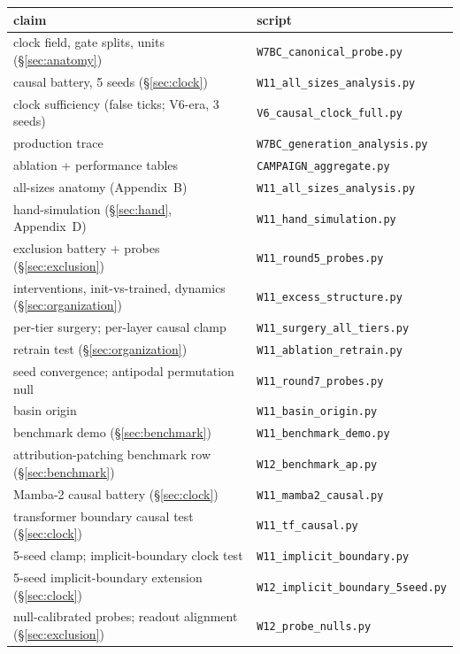 \documentclass[11pt]{article}
\begin{document}
\begin{center}
\small
\begin{tabular}{ll}
\toprule
claim & script \\
\midrule
clock field, gate splits, units (\S\ref{sec:anatomy}) & \texttt{W7BC\_canonical\_probe.py} \\
causal battery, 5 seeds (\S\ref{sec:clock}) & \texttt{W11\_all\_sizes\_analysis.py} \\
clock sufficiency (false ticks; V6-era, 3 seeds) & \texttt{V6\_causal\_clock\_full.py} \\
production trace & \texttt{W7BC\_generation\_analysis.py} \\
ablation + performance tables & \texttt{CAMPAIGN\_aggregate.py} \\
all-sizes anatomy (Appendix~B) & \texttt{W11\_all\_sizes\_analysis.py} \\
hand-simulation (\S\ref{sec:hand}, Appendix~D) & \texttt{W11\_hand\_simulation.py} \\
exclusion battery + probes (\S\ref{sec:exclusion}) & \texttt{W11\_round5\_probes.py} \\
interventions, init-vs-trained, dynamics (\S\ref{sec:organization}) & \texttt{W11\_excess\_structure.py} \\
per-tier surgery; per-layer causal clamp & \texttt{W11\_surgery\_all\_tiers.py} \\
retrain test (\S\ref{sec:organization}) & \texttt{W11\_ablation\_retrain.py} \\
seed convergence; antipodal permutation null & \texttt{W11\_round7\_probes.py} \\
basin origin & \texttt{W11\_basin\_origin.py} \\
benchmark demo (\S\ref{sec:benchmark}) & \texttt{W11\_benchmark\_demo.py} \\
attribution-patching benchmark row (\S\ref{sec:benchmark}) & \texttt{W12\_benchmark\_ap.py} \\
Mamba-2 causal battery (\S\ref{sec:clock}) & \texttt{W11\_mamba2\_causal.py} \\
transformer boundary causal test (\S\ref{sec:clock}) & \texttt{W11\_tf\_causal.py} \\
5-seed clamp; implicit-boundary clock test & \texttt{W11\_implicit\_boundary.py} \\
5-seed implicit-boundary extension (\S\ref{sec:clock}) & \texttt{W12\_implicit\_boundary\_5seed.py} \\
null-calibrated probes; readout alignment (\S\ref{sec:exclusion}) & \texttt{W12\_probe\_nulls.py} \\

\end{tabular}
\end{center}
\end{document}
